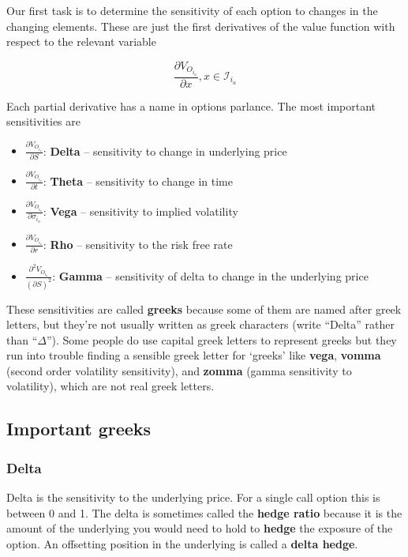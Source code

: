 Our first task is to determine the sensitivity  of each option to changes in the changing  elements. These are just the first derivatives of the value function with respect to the relevant variable

\[ \frac{\partial V_{O_{i_a}}}{\partial x}, x \in \mathcal{I}_{i_a}  \]

Each partial derivative has a name in options parlance. The most important sensitivities are

\begin{itemize}
\item $\frac{\partial V_{O_{i_a}}}{\partial S} $:  \textbf{Delta} -- sensitivity to change in underlying price\\
\item $\frac{\partial V_{O_{i_a}}}{\partial t} $: \textbf{Theta} -- sensitivity to change in time\\
\item $\frac{\partial V_{O_{i_a}}}{\partial \sigma_{i_a}} $:  \textbf{Vega} -- sensitivity to implied volatility\\
\item  $\frac{\partial V_{O_{i_a}}}{\partial r} $: \textbf{Rho} -- sensitivity to the risk free rate\\
\item $\frac{\partial^2 V_{O_{i_a}}}{(\partial S)^2} $: \textbf{Gamma} -- sensitivity of delta to change in the underlying price\\
\end{itemize}

These sensitivities are called \textbf{greeks} because some of them are named after greek letters, but they're not usually written as greek characters (write ``Delta'' rather than ``$\Delta$''). Some people do use capital greek letters to represent greeks but they run into trouble finding a sensible greek letter for `greeks' like \textbf{vega}, \textbf{vomma} (second order volatility sensitivity), and \textbf{zomma} (gamma sensitivity to volatility), which are not real greek letters. 
\subsection{Important greeks}

\subsubsection{Delta}

Delta is the sensitivity to the underlying price. For a single call option this is between 0 and 1. The delta is sometimes called the \textbf{hedge ratio} because it is the amount of the underlying you would need to hold to \textbf{hedge} the exposure of the option. An offsetting position in the underlying is called a \textbf{delta hedge}.
 
